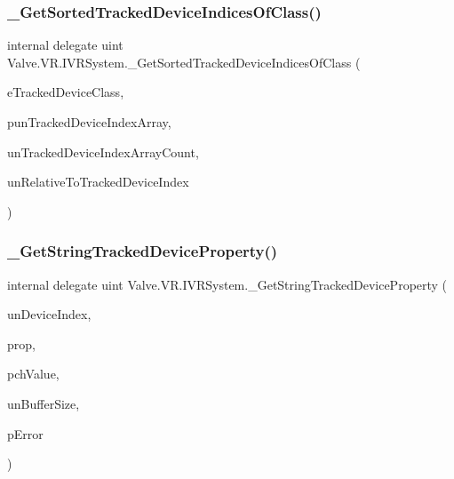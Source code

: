 \subsubsection{\texorpdfstring{\_GetSortedTrackedDeviceIndicesOfClass()}{\_GetSortedTrackedDeviceIndicesOfClass()}}
{\footnotesize\ttfamily internal delegate uint Valve.\+V\+R.\+I\+V\+R\+System.\+\_\+\+Get\+Sorted\+Tracked\+Device\+Indices\+Of\+Class (\begin{DoxyParamCaption}\item[{\mbox{\hyperlink{namespace_valve_1_1_v_r_aa1a3c2765fe53acb85372a57652c47a1}{E\+Tracked\+Device\+Class}}}]{e\+Tracked\+Device\+Class,  }\item[{\mbox{[}\+In, Out\mbox{]} uint \mbox{[}$\,$\mbox{]}}]{pun\+Tracked\+Device\+Index\+Array,  }\item[{uint}]{un\+Tracked\+Device\+Index\+Array\+Count,  }\item[{uint}]{un\+Relative\+To\+Tracked\+Device\+Index }\end{DoxyParamCaption})}

\mbox{\label{struct_valve_1_1_v_r_1_1_i_v_r_system_a6dec2a7ad8cb675cbc12248da723827b}} 
\subsubsection{\texorpdfstring{\_GetStringTrackedDeviceProperty()}{\_GetStringTrackedDeviceProperty()}}
{\footnotesize\ttfamily internal delegate uint Valve.\+V\+R.\+I\+V\+R\+System.\+\_\+\+Get\+String\+Tracked\+Device\+Property (\begin{DoxyParamCaption}\item[{uint}]{un\+Device\+Index,  }\item[{\mbox{\hyperlink{namespace_valve_1_1_v_r_ab060521ead7273986988fc4897e52482}{E\+Tracked\+Device\+Property}}}]{prop,  }\item[{System.\+Text.\+String\+Builder}]{pch\+Value,  }\item[{uint}]{un\+Buffer\+Size,  }\item[{ref \mbox{\hyperlink{namespace_valve_1_1_v_r_aab6684f03930a2d2cf22ed66b437e47b}{E\+Tracked\+Property\+Error}}}]{p\+Error }\end{DoxyParamCaption})}

